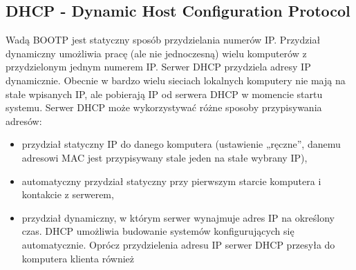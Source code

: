 \documentclass[a4paper]{article}
\begin{document}
\subsection{DHCP - Dynamic Host Configuration Protocol}
Wadą BOOTP jest statyczny sposób przydzielania numerów IP.
Przydział dynamiczny umożliwia pracę (ale nie jednoczesną) wielu komputerów z
przydzielonym jednym numerem IP.
Serwer DHCP przydziela adresy IP dynamicznie. Obecnie w bardzo wielu sieciach lokalnych
komputery nie mają na stałe wpisanych IP, ale pobierają IP od serwera DHCP w momencie
startu systemu.
Serwer DHCP może wykorzystywać różne sposoby przypisywania adresów:
\begin{itemize}
    \item przydział statyczny IP do danego komputera (ustawienie „ręczne”, danemu adresowi
MAC jest przypisywany stale jeden na stałe wybrany IP),
    \item automatyczny przydział statyczny przy pierwszym starcie komputera i kontakcie z
serwerem,
    \item przydział dynamiczny, w którym serwer wynajmuje adres IP na określony czas.
DHCP umożliwia budowanie systemów konfigurujących się automatycznie.
Oprócz przydzielenia adresu IP serwer DHCP przesyła do komputera klienta również 
\end{itemize}
\end{document}
